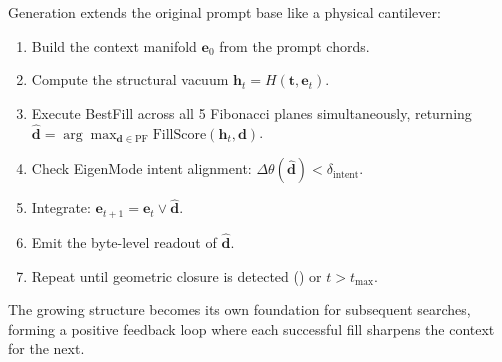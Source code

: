 Generation extends the original prompt base like a physical cantilever:

\begin{enumerate}[nosep]
  \item Build the context manifold $\mathbf{e}_0$ from the prompt chords.
  \item Compute the structural vacuum $\mathbf{h}_t = H(\mathbf{t},
        \mathbf{e}_t)$.
  \item Execute BestFill across all 5 Fibonacci planes simultaneously,
        returning $\hat{\mathbf{d}} = \arg\max_{\mathbf{d} \in \text{PF}}
        \text{FillScore}(\mathbf{h}_t, \mathbf{d})$.
  \item Check EigenMode intent alignment:
        $\Delta\theta(\hat{\mathbf{d}}) < \delta_{\text{intent}}$.
  \item Integrate: $\mathbf{e}_{t+1} = \mathbf{e}_t \lor
        \hat{\mathbf{d}}$.
  \item Emit the byte-level readout of $\hat{\mathbf{d}}$.
  \item Repeat until geometric closure is detected ()
        or $t > t_{\max}$.
\end{enumerate}

The growing structure becomes its own foundation for subsequent searches,
forming a positive feedback loop where each successful fill sharpens the
context for the next.
